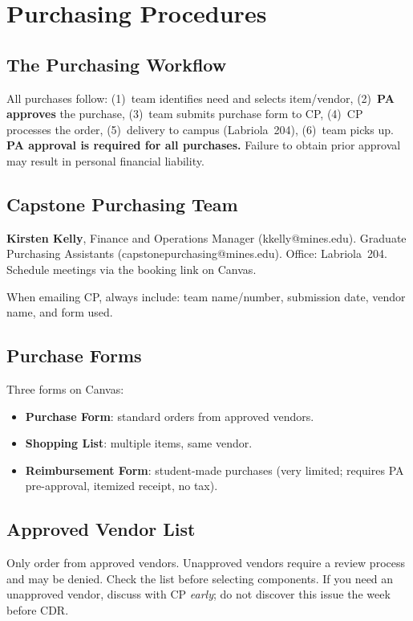 \chapter{Purchasing Procedures}

\section{The Purchasing Workflow}
All purchases follow: (1)~team identifies need and selects item/vendor, (2)~\textbf{PA approves} the purchase, (3)~team submits purchase form to CP, (4)~CP processes the order, (5)~delivery to campus (Labriola~204), (6)~team picks up. \textbf{PA approval is required for all purchases.} Failure to obtain prior approval may result in personal financial liability.

\section{Capstone Purchasing Team}
\textbf{Kirsten Kelly}, Finance and Operations Manager (kkelly@mines.edu). Graduate Purchasing Assistants (capstonepurchasing@mines.edu). Office: Labriola~204. Schedule meetings via the booking link on Canvas.

When emailing CP, always include: team name/number, submission date, vendor name, and form used.

\section{Purchase Forms}
Three forms on Canvas:
\begin{itemize}[nosep,leftmargin=1.5em]
\item \textbf{Purchase Form}: standard orders from approved vendors.
\item \textbf{Shopping List}: multiple items, same vendor.
\item \textbf{Reimbursement Form}: student-made purchases (very limited; requires PA pre-approval, itemized receipt, no tax).
\end{itemize}

\section{Approved Vendor List}
Only order from approved vendors. Unapproved vendors require a review process and may be denied. Check the list before selecting components. If you need an unapproved vendor, discuss with CP \emph{early}; do not discover this issue the week before CDR.

